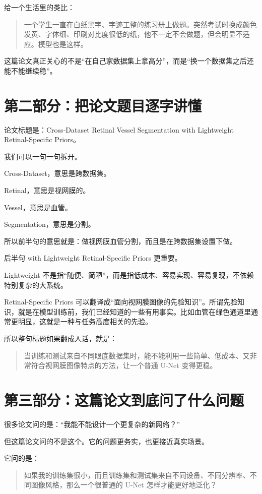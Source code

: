 \documentclass[12pt,a4paper]{ctexart}
\begin{document}
给一个生活里的类比：

\begin{quote}
一个学生一直在白纸黑字、字迹工整的练习册上做题。突然考试时换成颜色发黄、字体细、印刷对比度很低的纸，他不一定不会做题，但会明显不适应。模型也是这样。
\end{quote}

这篇论文真正关心的不是“在自己家数据集上拿高分”，而是“换一个数据集之后还能不能继续稳”。

\section*{第二部分：把论文题目逐字讲懂}

论文标题是：Cross-Dataset Retinal Vessel Segmentation with Lightweight Retinal-Specific Priors。

我们可以一句一句拆开。

Cross-Dataset，意思是跨数据集。

Retinal，意思是视网膜的。

Vessel，意思是血管。

Segmentation，意思是分割。

所以前半句的意思就是：做视网膜血管分割，而且是在跨数据集设置下做。

后半句 with Lightweight Retinal-Specific Priors 更重要。

Lightweight 不是指“随便、简陋”，而是指低成本、容易实现、容易复现，不依赖特别复杂的大系统。

Retinal-Specific Priors 可以翻译成“面向视网膜图像的先验知识”。所谓先验知识，就是在模型训练前，我们已经知道的一些有用事实。比如血管在绿色通道里通常更明显，这就是一种与任务高度相关的先验。

所以整句标题如果翻成人话，就是：

\begin{quote}
当训练和测试来自不同眼底数据集时，能不能利用一些简单、低成本、又非常符合视网膜图像特点的方法，让一个普通 U-Net 变得更稳。
\end{quote}

\section*{第三部分：这篇论文到底问了什么问题}

很多论文问的是：“我能不能设计一个更复杂的新网络？”

但这篇论文问的不是这个。它的问题更务实，也更接近真实场景。

它问的是：

\begin{quote}
如果我的训练集很小，而且训练集和测试集来自不同设备、不同分辨率、不同图像风格，那么一个很普通的 U-Net 怎样才能更好地泛化？
\end{quote}
\end{document}
